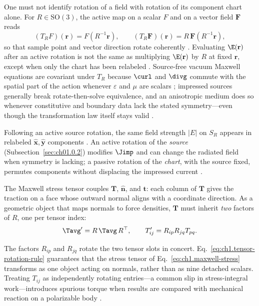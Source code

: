 One must not identify rotation of a field with rotation of its component chart alone. For $R\in\mathrm{SO}(3)$, the active map on a scalar $F$ and on a vector field $\mathbf{F}$ reads
\begin{equation}
\label{eq:ch1.field-rotation-operator}
(T_R F)(\mathbf{r})=F(R^{-1}\mathbf{r}),
\qquad
(T_R\mathbf{F})(\mathbf{r})=R\,\mathbf{F}(R^{-1}\mathbf{r}),
\end{equation}
so that sample point and vector direction rotate coherently \cite{jackson1999}. Evaluating $\E(\mathbf{r})$ after an active rotation is not the same as multiplying $\E(\mathbf{r})$ by $R$ at fixed $\mathbf{r}$, except when only the chart has been relabeled \cite{stratton1941}. Source-free vacuum Maxwell equations are covariant under $T_R$ because $\curl$ and $\divg$ commute with the spatial part of the action whenever $\varepsilon$ and $\mu$ are scalars \cite{maxwell1873}; impressed sources generally break rotate-then-solve equivalence, and an anisotropic medium does so whenever constitutive and boundary data lack the stated symmetry---even though the transformation law itself stays valid \cite{stratton1941}.

Following an active source rotation, the same field strength $|E|$ on $S_R$ appears in relabeled $\hat{\mathbf{x}},\hat{\mathbf{y}}$ components \cite{hansen1988}. An active rotation of the \emph{source} (Subsection~\ref{sec:ch01.0.2}) modifies $\Jimp$ and can change the radiated field when symmetry is lacking; a passive rotation of the \emph{chart}, with the source fixed, permutes components without displacing the impressed current \cite{stratton1941}.

The Maxwell stress tensor couples $\mathbf{T}$, $\hat{\mathbf{n}}$, and $\mathbf{t}$: each column of $\mathbf{T}$ gives the traction on a face whose outward normal aligns with a coordinate direction. As a geometric object that maps normals to force densities, $\mathbf{T}$ must inherit \emph{two} factors of $R$, one per tensor index:
\begin{equation}
\label{eq:ch1.passive-rotation-action}\Tavg' = R\,\Tavg\,R^\top,
\qquad
T'_{ij}=R_{ip}R_{jq}T_{pq}.
\end{equation}
\addtocounter{equation}{-1}\label{eq:ch1.tensor-rotation-rule}%
\addtocounter{equation}{-1}\label{eq:ch1.vector-observable-covariance}%
The factors $R_{ip}$ and $R_{jq}$ rotate the two tensor slots in concert. Eq.~\eqref{eq:ch1.tensor-rotation-rule} guarantees that the stress tensor of Eq.~\eqref{eq:ch1.maxwell-stress} transforms as one object acting on normals, rather than as nine detached scalars.
Treating $T_{ij}$ as independently rotating entries---a common slip in stress-integral work---introduces spurious torque when results are compared with mechanical reaction on a polarizable body \cite{beth1936}.

